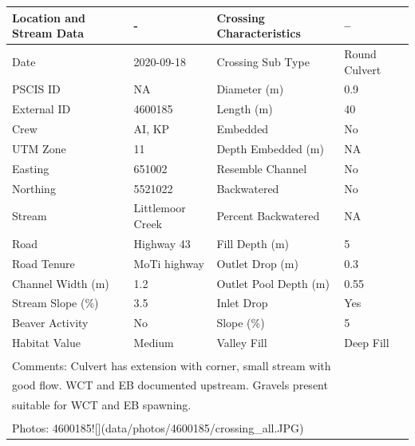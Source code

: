 \documentclass[
]{book}
\begin{document}
\begin{tabular}{llll}
\toprule
Location and Stream Data & - & Crossing Characteristics & --\\
\midrule
Date & 2020-09-18 & Crossing Sub Type & Round Culvert\\
PSCIS ID & NA & Diameter (m) & 0.9\\
External ID & 4600185 & Length (m) & 40\\
Crew & AI, KP & Embedded & No\\
UTM Zone & 11 & Depth Embedded (m) & NA\\
\addlinespace
Easting & 651002 & Resemble Channel & No\\
Northing & 5521022 & Backwatered & No\\
Stream & Littlemoor Creek & Percent Backwatered & NA\\
Road & Highway 43 & Fill Depth (m) & 5\\
Road Tenure & MoTi highway & Outlet Drop (m) & 0.3\\
\addlinespace
Channel Width (m) & 1.2 & Outlet Pool Depth (m) & 0.55\\
Stream Slope (\%) & 3.5 & Inlet Drop & Yes\\
Beaver Activity & No & Slope (\%) & 5\\
Habitat Value & Medium & Valley Fill & Deep Fill\\
\bottomrule
\multicolumn{4}{l}{\textsuperscript{} Comments: Culvert has extension with corner, small stream with}\\
\multicolumn{4}{l}{good flow. WCT and EB documented upstream. Gravels present}\\
\multicolumn{4}{l}{suitable for WCT and EB spawning.}\\
\multicolumn{4}{l}{\textsuperscript{} Photos: 4600185![](data/photos/4600185/crossing\_all.JPG)}\\
\end{tabular}
\end{document}
